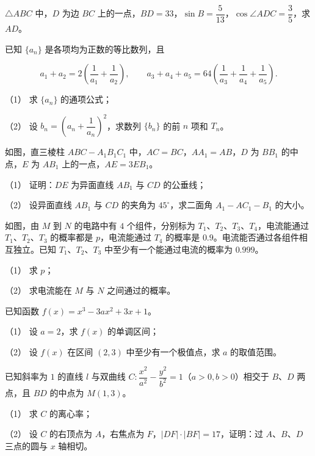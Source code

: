 \begin{question}
$\triangle ABC$ 中，$D$ 为边 $BC$ 上的一点，$BD=33$，$\sin B=\dfrac5{13}$，$\cos\angle ADC=\dfrac35$，求 $AD$。

\end{question}
\begin{question}
已知 $\{a_n\}$ 是各项均为正数的等比数列，且

\nopagebreak[4]
\[
a_1+a_2=2\left(\frac1{a_1}+\frac1{a_2}\right),\qquad
a_3+a_4+a_5=64\left(\frac1{a_3}+\frac1{a_4}+\frac1{a_5}\right).
\]

（1） 求 $\{a_n\}$ 的通项公式；

（2） 设 $b_n=\left(a_n+\dfrac1{a_n}\right)^2$，求数列 $\{b_n\}$ 的前 $n$ 项和 $T_n$。

\Needspace{0.4\textheight}
\end{question}
\begin{question}
如图，直三棱柱 $ABC-A_1B_1C_1$ 中，$AC=BC$，$AA_1=AB$，$D$ 为 $BB_1$ 的中点，$E$ 为 $AB_1$ 上的一点，$AE=3EB_1$。
\nopagebreak[4]
\begin{center}\end{center}
\nopagebreak[4]
（1） 证明：$DE$ 为异面直线 $AB_1$ 与 $CD$ 的公垂线；

（2） 设异面直线 $AB_1$ 与 $CD$ 的夹角为 $45^\circ$，求二面角 $A_1-AC_1-B_1$ 的大小。

\Needspace{0.4\textheight}
\end{question}
\begin{question}
如图，由 $M$ 到 $N$ 的电路中有 $4$ 个组件，分别标为 $T_1\text{、}T_2\text{、}T_3\text{、}T_4$，电流能通过 $T_1\text{、}T_2\text{、}T_3$ 的概率都是 $p$，电流能通过 $T_4$ 的概率是 $0.9$。电流能否通过各组件相互独立。已知 $T_1\text{、}T_2\text{、}T_3$ 中至少有一个能通过电流的概率为 $0.999$。
\nopagebreak[4]
\begin{center}\end{center}
\nopagebreak[4]
（1） 求 $p$；

（2） 求电流能在 $M$ 与 $N$ 之间通过的概率。

\end{question}
\begin{question}
已知函数 $f(x)=x^3-3ax^2+3x+1$。

（1） 设 $a=2$，求 $f(x)$ 的单调区间；

（2） 设 $f(x)$ 在区间 $(2,3)$ 中至少有一个极值点，求 $a$ 的取值范围。

\end{question}
\begin{question}
已知斜率为 $1$ 的直线 $l$ 与双曲线 $C:\dfrac{x^2}{a^2}-\dfrac{y^2}{b^2}=1$（$a>0,b>0$）相交于 $B\text{、}D$ 两点，且 $BD$ 的中点为 $M(1,3)$。

（1） 求 $C$ 的离心率；

（2） 设 $C$ 的右顶点为 $A$，右焦点为 $F$，$|DF|\cdot|BF|=17$，证明：过 $A\text{、}B\text{、}D$ 三点的圆与 $x$ 轴相切。

\end{question}